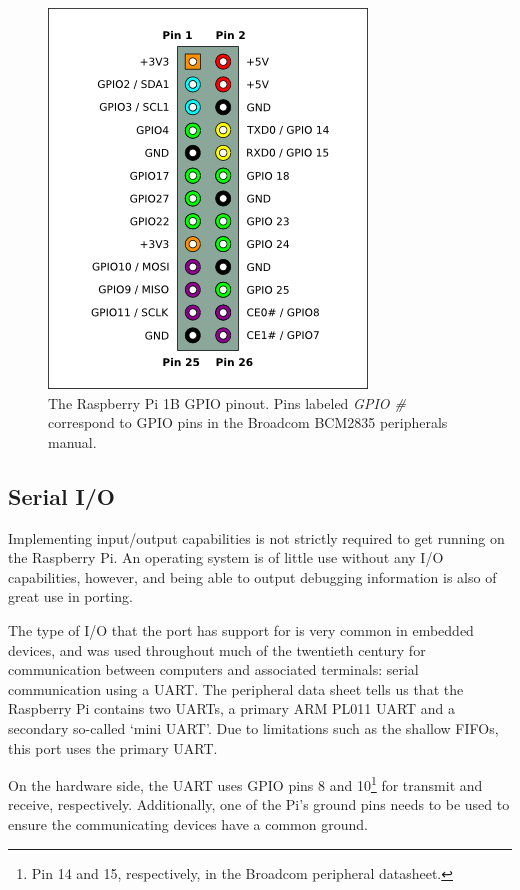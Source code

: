 \begin{figure}[ht]
    \centering
    \includegraphics[scale=0.5]{figures/Pi-GPIO-header-26-sm.png}
    \caption{The Raspberry Pi 1B GPIO pinout. Pins labeled \textit{GPIO \#} correspond to GPIO pins in the Broadcom BCM2835 peripherals manual\cite{bcm:2835peripherals}.}
    \label{fig:gpiopinout}
\end{figure}


\subsection{Serial I/O} \label{sec:miniuart}
Implementing input/output capabilities is not strictly required to get \ucosiii running on the Raspberry Pi. An operating system is of little use without any I/O capabilities, however, and being able to output debugging information is also of great use in porting.

The type of I/O that the port has support for is very common in embedded devices, and was used throughout much of the twentieth century for communication between computers and associated terminals: serial communication using a UART. The peripheral data sheet tells us that the Raspberry Pi contains two UARTs, a primary ARM PL011 UART and a secondary so-called `mini UART'. Due to limitations such as the shallow FIFOs, this port uses the primary UART.

On the hardware side, the UART uses GPIO pins 8 and 10\footnote{Pin 14 and 15, respectively, in the Broadcom peripheral datasheet.} for transmit and receive, respectively. Additionally, one of the Pi's ground pins needs to be used to ensure the communicating devices have a common ground.

